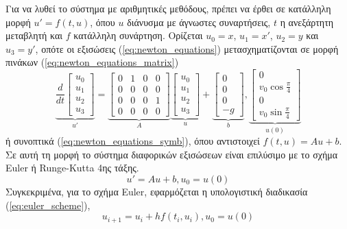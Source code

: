 \documentclass[assignment4.tex]{subfiles}
\begin{document}
Για να λυθεί το σύστημα με αριθμητικές μεθόδους, πρέπει να έρθει σε κατάλληλη μορφή $u'=f(t,u)$, όπου $u$ διάνυσμα με άγνωστες συναρτήσεις, $t$ η ανεξάρτητη μεταβλητή και $f$ κατάλληλη συνάρτηση. Ορίζεται $u_0=x$, $u_1=x'$, $u_2=y$ και $u_3=y'$, οπότε οι εξισώσεις (\ref{eq:newton_equations}) μετασχηματίζονται σε μορφή πινάκων (\ref{eq:newton_equations_matrix})
\begin{equation}
\underbrace{\frac{d}{dt}\left[
\begin{matrix}
u_0 \\
u_1 \\
u_2 \\
u_3
\end{matrix}
\right]
}_{u'}
=
\underbrace{\left[
\begin{matrix}
0 & 1 & 0 & 0\\
0 & 0 & 0 & 0\\
0 & 0 & 0 & 1\\
0 & 0 & 0 & 0
\end{matrix}
\right]
}_{A}
\underbrace{\left[
\begin{matrix}
u_0 \\
u_1 \\
u_2 \\
u_3
\end{matrix}
\right]
}_{u}
+
\underbrace{\left[
\begin{matrix}
0 \\
0 \\
0 \\
-g
\end{matrix}
\right]
}_{b}
,
\underbrace{\left[
	\begin{matrix}
	0 \\
	v_0\cos\frac{\pi}{4} \\
	0 \\
	v_0 \sin\frac{\pi}{4}
	\end{matrix}
	\right]
}_{u(0)}
\label{eq:newton_equations_matrix}
\end{equation}
ή συνοπτικά (\ref{eq:newton_equations_symb}), όπου αντιστοιχεί $f(t, u)=Au + b$. Σε αυτή τη μορφή το σύστημα διαφορικών εξισώσεων είναι επιλύσιμο με το σχήμα \textlatin{Euler} ή \textlatin{Runge-Kutta} 4ης τάξης.
\begin{equation}
u' = Au + b, u_0=u(0)
\label{eq:newton_equations_symb}
\end{equation}
Συγκεκριμένα, για το σχήμα \textlatin{Euler}, εφαρμόζεται η υπολογιστική διαδικασία (\ref{eq:euler_scheme}),
\begin{equation}
u_{i+1} = u_i + hf(t_i, u_i) , u_0=u(0)
\label{eq:euler_scheme}
\end{equation}
\end{document}
